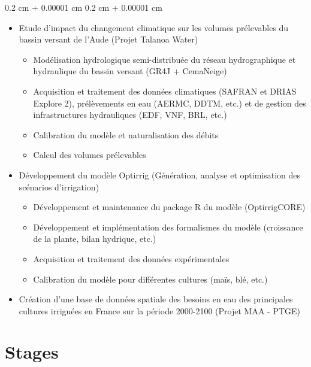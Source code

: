 \documentclass[10pt, letterpaper]{article}
\newenvironment{highlights}{
  \begin{itemize}[
    topsep=0.10 cm,
    parsep=0.10 cm,
    partopsep=0pt,
    itemsep=0pt,
    leftmargin=0.4 cm + 10pt
  ]
}{
  \end{itemize}
} %
\newenvironment{onecolentry}{
  \begin{adjustwidth}{
    0.2 cm + 0.00001 cm
  }{
    0.2 cm + 0.00001 cm
  }
}{
  \end{adjustwidth}
} %
\begin{document}
  \begin{onecolentry}
    \begin{highlights}
      \item{
        Etude d'impact du changement climatique sur les volumes prélevables du
        bassin versant de l'Aude (Projet Talanoa Water)
        \begin{itemize}
          \item Modélisation hydrologique semi-distribuée du réseau hydrographique
          et hydraulique du bassin versant (GR4J + CemaNeige)
          \item Acquisition et traitement des données climatiques (SAFRAN et DRIAS
          Explore 2), prélèvements en eau (AERMC, DDTM, etc.) et de gestion des
          infrastructures hydrauliques (EDF, VNF, BRL, etc.)
          \item Calibration du modèle et naturalisation des débits
          \item Calcul des volumes prélevables
        \end{itemize}
      }
      \item{
        Développement du modèle Optirrig (Génération, analyse et optimisation des
        scénarios d'irrigation)
        \begin{itemize}
          \item Développement et maintenance du package R du modèle (OptirrigCORE)
          \item Développement et implémentation des formalismes du modèle
          (croissance de la plante, bilan hydrique, etc.)
          \item Acquisition et traitement des données expérimentales
          \item Calibration du modèle pour différentes cultures (maïs, blé, etc.)
        \end{itemize}
      }
      \item Création d'une base de données spatiale des besoins en eau des
      principales cultures irriguées en France sur la période 2000-2100 (Projet
      MAA - PTGE)
    \end{highlights}
  \end{onecolentry}

\vspace{0.2 cm}


\section{Stages}
\end{document}
